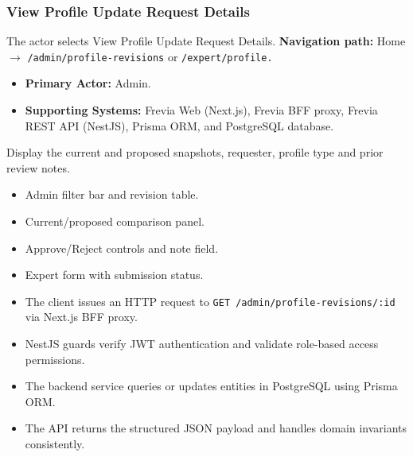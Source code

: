 \subsubsection{View Profile Update Request Details}

The actor selects View Profile Update Request Details.\newline
\textbf{Navigation path:} Home $\rightarrow$ \texttt{/\allowbreak{}admin/\allowbreak{}profile-\allowbreak{}revisions} or \texttt{/\allowbreak{}expert/\allowbreak{}profile.}


\begin{itemize}[leftmargin=1.6em,topsep=3pt,itemsep=2pt,parsep=0pt,label=$\bullet$]
    \item \textbf{Primary Actor:} Admin.
    \item \textbf{Supporting Systems:} Frevia Web (Next.js), Frevia BFF proxy, Frevia REST API (NestJS), Prisma ORM, and PostgreSQL database.
\end{itemize}

\noindent Display the current and proposed snapshots, requester, profile type and prior review notes.

\begin{itemize}[leftmargin=1.6em,topsep=3pt,itemsep=2pt,parsep=0pt,label=$\bullet$]
    \item Admin filter bar and revision table.
    \item Current/proposed comparison panel.
    \item Approve/Reject controls and note field.
    \item Expert form with submission status.
\end{itemize}

\begin{itemize}[leftmargin=1.6em,topsep=3pt,itemsep=2pt,parsep=0pt,label=$\bullet$]
    \item The client issues an HTTP request to \texttt{GET /\allowbreak{}admin/\allowbreak{}profile-\allowbreak{}revisions/\allowbreak{}:\allowbreak{}id} via Next.js BFF proxy.
    \item NestJS guards verify JWT authentication and validate role-based access permissions.
    \item The backend service queries or updates entities in PostgreSQL using Prisma ORM.
    \item The API returns the structured JSON payload and handles domain invariants consistently.
\end{itemize}


